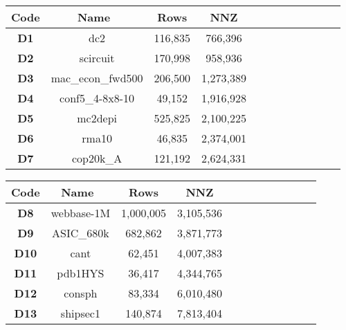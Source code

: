 \begin{table*}[ht]
    \caption{Datasets for the SpMV benchmark (from DASP~\cite{10.1145/3581784.3607051}). The dataset is ranked by the non-zero value size}
    \vspace{-14pt}
\footnotesize
    {%
    \begin{tabular}[t]{|cccc|cccc|cccc|}
    \hline
        \textbf{Code} & \textbf{Name~\cite{davis2011university}} & \textbf{Rows} & \textbf{NNZ} \\ \hline
        \textbf{D1}   & dc2                                    & 116,835       & 766,396       \\
        \textbf{D2}   & scircuit                               & 170,998       & 958,936       \\
        \textbf{D3}   & mac\_econ\_fwd500                      & 206,500       & 1,273,389     \\
        \textbf{D4}   & conf5\_4-8x8-10                        & 49,152        & 1,916,928     \\
        \textbf{D5}   & mc2depi                                & 525,825       & 2,100,225     \\
        \textbf{D6}   & rma10                                  & 46,835        & 2,374,001     \\
        \textbf{D7}   & cop20k\_A                              & 121,192       & 2,624,331     \\ \hline
    \end{tabular}
    \begin{tabular}[t]{|cccc|cccc|cccc|}
    \hline
        \textbf{Code} & \textbf{Name~\cite{davis2011university}} & \textbf{Rows} & \textbf{NNZ} \\ \hline
        \textbf{D8}   & webbase-1M                             & 1,000,005     & 3,105,536     \\
        \textbf{D9}   & ASIC\_680k                             & 682,862       & 3,871,773     \\
        \textbf{D10}  & cant                                   & 62,451        & 4,007,383     \\
        \textbf{D11}  & pdb1HYS                                & 36,417        & 4,344,765     \\
        \textbf{D12}  & consph                                 & 83,334        & 6,010,480     \\
        \textbf{D13}  & shipsec1                               & 140,874       & 7,813,404     \\

\end{tabular}}
\end{table*}
